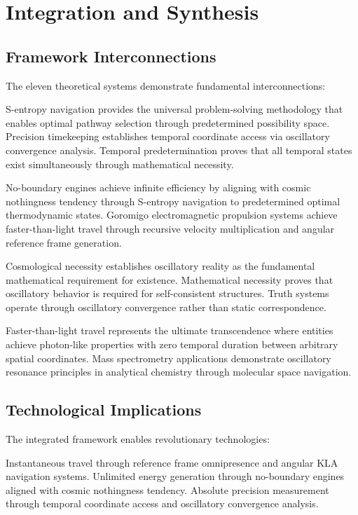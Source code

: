 \documentclass[12pt,a4paper]{article}
\begin{document}
\section{Integration and Synthesis}

\subsection{Framework Interconnections}

The eleven theoretical systems demonstrate fundamental interconnections:

S-entropy navigation provides the universal problem-solving methodology that enables optimal pathway selection through predetermined possibility space. Precision timekeeping establishes temporal coordinate access via oscillatory convergence analysis. Temporal predetermination proves that all temporal states exist simultaneously through mathematical necessity.

No-boundary engines achieve infinite efficiency by aligning with cosmic nothingness tendency through S-entropy navigation to predetermined optimal thermodynamic states. Goromigo electromagnetic propulsion systems achieve faster-than-light travel through recursive velocity multiplication and angular reference frame generation.

Cosmological necessity establishes oscillatory reality as the fundamental mathematical requirement for existence. Mathematical necessity proves that oscillatory behavior is required for self-consistent structures. Truth systems operate through oscillatory convergence rather than static correspondence.

Faster-than-light travel represents the ultimate transcendence where entities achieve photon-like properties with zero temporal duration between arbitrary spatial coordinates. Mass spectrometry applications demonstrate oscillatory resonance principles in analytical chemistry through molecular space navigation.

\subsection{Technological Implications}

The integrated framework enables revolutionary technologies:

Instantaneous travel through reference frame omnipresence and angular KLA navigation systems. Unlimited energy generation through no-boundary engines aligned with cosmic nothingness tendency. Absolute precision measurement through temporal coordinate access and oscillatory convergence analysis.
\end{document}

